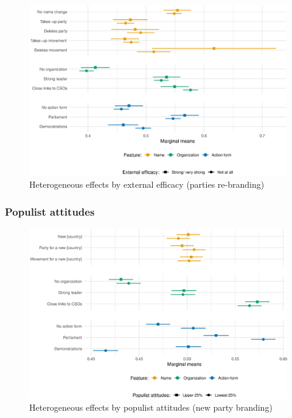 \documentclass[12pt]{article}
\begin{document}
\begin{figure}[H]
\includegraphics[width=\textwidth]{./Figures/CJ2_heteff_ext_eff_tradeoff.eps}
\caption{Heterogeneous effects by external efficacy (parties re-branding)}
\end{figure}

\subsubsection{Populist attitudes}

\begin{figure}[H]
\includegraphics[width=\textwidth]{./Figures/CJ1_heteff_populism_cat_tradeoff.eps}
\caption{Heterogeneous effects by populist attitudes (new party branding)}
\end{figure}
\end{document}
